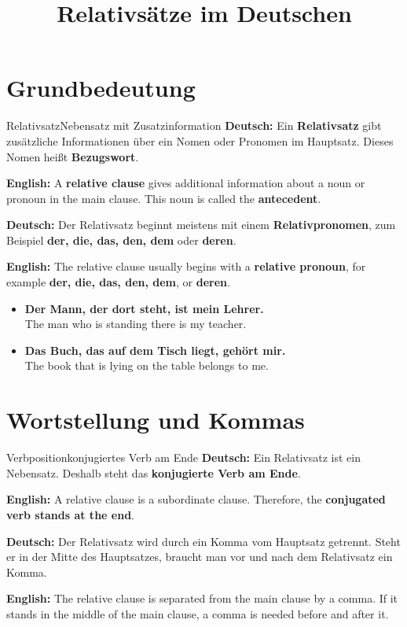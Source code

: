 \documentclass[a4paper,11pt]{article}
\title{Relativsätze im Deutschen}
\date{}
\newcommand{\GermanText}[1]{\textbf{Deutsch: }#1\par}
\newcommand{\EnglishText}[1]{{\small\color{SoftGray}\textbf{English: }#1\par}}
\newcommand{\ExampleItem}[2]{\item \textbf{#1}\\{\small\color{SoftGray}#2}}
\begin{document}
    \maketitle
    \tableofcontents
    \newpage

    \section{Grundbedeutung}

        \begin{grammarentry}{Relativsatz}{Nebensatz mit Zusatzinformation}
            \GermanText{Ein \textbf{Relativsatz} gibt zusätzliche Informationen über ein Nomen oder Pronomen im Hauptsatz. Dieses Nomen heißt \textbf{Bezugswort}.}
            \EnglishText{A \textbf{relative clause} gives additional information about a noun or pronoun in the main clause. This noun is called the \textbf{antecedent}.}

            \GermanText{Der Relativsatz beginnt meistens mit einem \textbf{Relativpronomen}, zum Beispiel \textbf{der, die, das, den, dem} oder \textbf{deren}.}
            \EnglishText{The relative clause usually begins with a \textbf{relative pronoun}, for example \textbf{der, die, das, den, dem}, or \textbf{deren}.}
        \end{grammarentry}

        \begin{exbox}
            \begin{itemize}
                \ExampleItem{Der Mann, der dort steht, ist mein Lehrer.}{The man who is standing there is my teacher.}
                \ExampleItem{Das Buch, das auf dem Tisch liegt, gehört mir.}{The book that is lying on the table belongs to me.}
            \end{itemize}
        \end{exbox}

    \section{Wortstellung und Kommas}

        \begin{grammarentry}{Verbposition}{konjugiertes Verb am Ende}
            \GermanText{Ein Relativsatz ist ein Nebensatz. Deshalb steht das \textbf{konjugierte Verb am Ende}.}
            \EnglishText{A relative clause is a subordinate clause. Therefore, the \textbf{conjugated verb stands at the end}.}

            \GermanText{Der Relativsatz wird durch ein Komma vom Hauptsatz getrennt. Steht er in der Mitte des Hauptsatzes, braucht man vor und nach dem Relativsatz ein Komma.}
            \EnglishText{The relative clause is separated from the main clause by a comma. If it stands in the middle of the main clause, a comma is needed before and after it.}
        \end{grammarentry}
\end{document}
